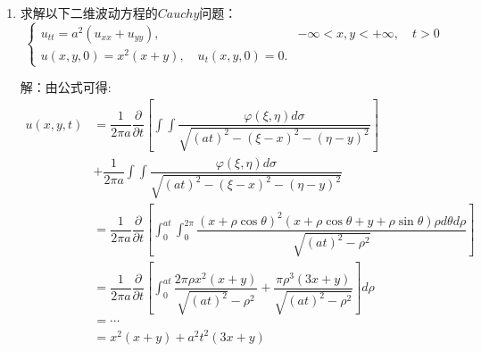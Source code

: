 \documentclass[11pt]{article}
\begin{document}
\begin{enumerate}
    \item  求解以下二维波动方程的$Cauchy$问题：
    \[
    \left\{
     \begin{array}{lr}
     u_{tt}=a^2(u_{xx}+u_{yy}),& -\infty<x,y<+\infty,\quad t>0 \\
     u(x,y,0)=x^2(x+y),\quad u_t(x,y,0)=0.
     \end{array}
    \right. \]

    解：由公式可得:
    \begin{align*}
    u(x,y,t) &= \dfrac{1}{2\pi a}\dfrac{\partial }{\partial t}\left[\int\int \dfrac{\varphi(\xi,\eta)d\sigma}{\sqrt{(at)^2-(\xi-x)^2-(\eta-y)^2}}\right]     \\[8pt]
           &+  \dfrac{1}{2\pi a}\int\int\dfrac{\varphi(\xi,\eta)d\sigma}{\sqrt{(at)^2-(\xi-x)^2-(\eta-y)^2}}   \\[8pt]
           &= \dfrac{1}{2\pi a}\dfrac{\partial}{\partial t}\left[\int_{0}^{at}\int_{0}^{2\pi}\dfrac{(x+\rho\cos\theta)^2(x+\rho\cos\theta+y+\rho\sin\theta)\rho d\theta d\rho}{\sqrt{(at)^2-\rho^2}}\right] \\
           &= \dfrac{1}{2\pi a}\dfrac{\partial }{\partial t}\left[\int_{0}^{at}\dfrac{2\pi\rho x^2(x+y)}{\sqrt{(at)^2}-\rho^2}+\dfrac{\pi \rho^3(3x+y)}{\sqrt{(at)^2-\rho^2}}\right]d\rho \\
           &= \cdots \\
           &= x^2(x+y)+a^{2}t^2 (3x+y)
\end{align*}


\end{enumerate}
\end{document}
